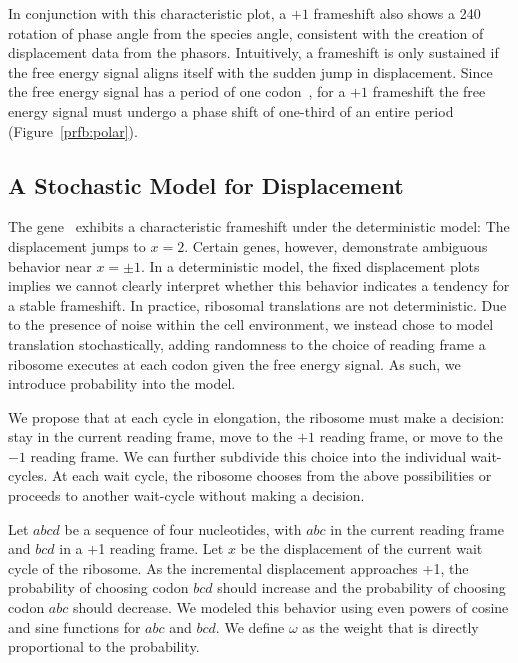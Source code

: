 \documentclass[12pt, draft]{article}
\numberwithin{equation}{section}
\begin{document}
In conjunction with this characteristic plot, a $+1$ frameshift also shows a 240\degree
rotation of phase angle from the species angle, consistent with the creation of displacement data from the phasors.
Intuitively, a frameshift is only sustained if the free energy signal aligns itself with the sudden jump in displacement.
Since the free energy signal has a period of one codon~\cite{lalit:mechanics}, for a $+1$ frameshift the free energy signal
must undergo a phase shift of one-third of an entire period (Figure~\ref{prfb:polar}).

\subsection{A Stochastic Model for Displacement}


The gene \prfB\ exhibits a characteristic frameshift under the deterministic model: The displacement jumps to $x=2$.
Certain genes, however, demonstrate ambiguous behavior near $x = \pm 1$.
In a deterministic model, the fixed displacement plots implies
we cannot clearly interpret whether this behavior indicates a tendency for a stable frameshift.
In practice, ribosomal translations are not deterministic. Due to the presence of
noise within the cell environment, we instead chose to model translation stochastically, adding
randomness to the choice of reading frame a ribosome executes at each codon given the free energy signal.
As such, we introduce probability into the model.

We propose that at each cycle in elongation, the ribosome must make a decision: stay in the current reading frame,
move to the $+1$ reading frame,
or move to the $-1$ reading frame.  We can further subdivide this choice into the individual wait-cycles.
At each wait cycle, the ribosome chooses from the above possibilities or proceeds to another wait-cycle without making a decision.

Let $abcd$ be a sequence of four nucleotides, with $abc$ in the
current reading frame and $bcd$ in a +1 reading frame.  Let $x$ be the
displacement of the current wait cycle of the ribosome.  As the
incremental displacement approaches +1, the probability of choosing
codon $bcd$ should increase and the probability of choosing codon
$abc$ should decrease.  We modeled this behavior using even powers of
cosine and sine functions for $abc$ and $bcd$.  We
define $\omega$ as the weight that is directly proportional to
the probability.
\end{document}
